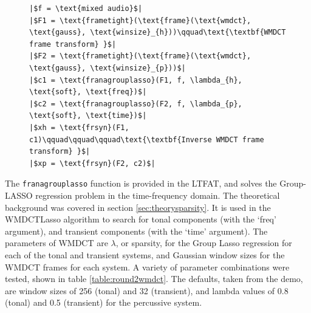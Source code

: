 \documentclass[letter,12pt]{article}
\newlength{\mintednumbersep}
\begin{document}
\begin{figure}[h]
  \centering
  \centering
\begin{verbatim}
|$f = \text{mixed audio}$|
|$F1 = \text{frametight}(\text{frame}(\text{wmdct}, \text{gauss}, \text{winsize}_{h}))\qquad\text{\textbf{WMDCT frame transform} }$|
|$F2 = \text{frametight}(\text{frame}(\text{wmdct}, \text{gauss}, \text{winsize}_{p}))$|
|$c1 = \text{franagrouplasso}(F1, f, \lambda_{h}, \text{soft}, \text{freq})$|
|$c2 = \text{franagrouplasso}(F2, f, \lambda_{p}, \text{soft}, \text{time})$|
|$xh = \text{frsyn}(F1, c1)\qquad\qquad\qquad\text{\textbf{Inverse WMDCT frame transform} }$|
|$xp = \text{frsyn}(F2, c2)$|
\end{verbatim}
  \label{lst:wmdctlasso}
\end{figure}

The \Verb#franagrouplasso# function is provided in the LTFAT, and solves the Group-LASSO regression problem in the time-frequency domain. The theoretical background was covered in section \ref{sec:theorysparsity}. It is used in the WMDCTLasso algorithm to search for tonal components (with the `freq' argument), and transient components (with the `time' argument). The parameters of WMDCT are $\lambda$, or sparsity, for the Group Lasso regression for each of the tonal and transient systems, and Gaussian window sizes for the WMDCT frames for each system. A variety of parameter combinations were tested, shown in table \ref{table:round2wmdct}. The defaults, taken from the demo, are window sizes of 256 (tonal) and 32 (transient), and lambda values of 0.8 (tonal) and 0.5 (transient) for the percussive system.
\end{document}
